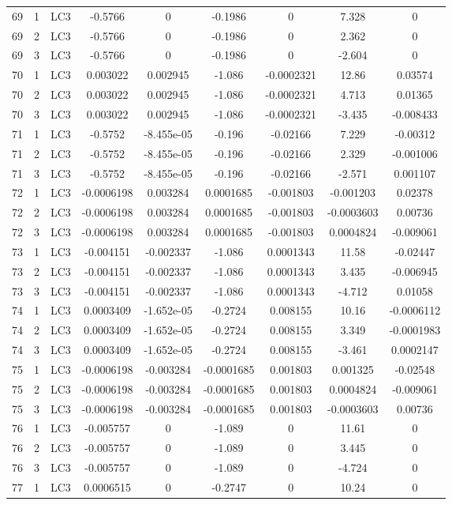 \documentclass{article}%
\begin{document}
\begin{longtable}{| c c c | c c c c c c |}
69&1&LC3&{-}0.5766&0&{-}0.1986&0&7.328&0\\%
69&2&LC3&{-}0.5766&0&{-}0.1986&0&2.362&0\\%
69&3&LC3&{-}0.5766&0&{-}0.1986&0&{-}2.604&0\\%
70&1&LC3&0.003022&0.002945&{-}1.086&{-}0.0002321&12.86&0.03574\\%
70&2&LC3&0.003022&0.002945&{-}1.086&{-}0.0002321&4.713&0.01365\\%
70&3&LC3&0.003022&0.002945&{-}1.086&{-}0.0002321&{-}3.435&{-}0.008433\\%
71&1&LC3&{-}0.5752&{-}8.455e{-}05&{-}0.196&{-}0.02166&7.229&{-}0.00312\\%
71&2&LC3&{-}0.5752&{-}8.455e{-}05&{-}0.196&{-}0.02166&2.329&{-}0.001006\\%
71&3&LC3&{-}0.5752&{-}8.455e{-}05&{-}0.196&{-}0.02166&{-}2.571&0.001107\\%
72&1&LC3&{-}0.0006198&0.003284&0.0001685&{-}0.001803&{-}0.001203&0.02378\\%
72&2&LC3&{-}0.0006198&0.003284&0.0001685&{-}0.001803&{-}0.0003603&0.00736\\%
72&3&LC3&{-}0.0006198&0.003284&0.0001685&{-}0.001803&0.0004824&{-}0.009061\\%
73&1&LC3&{-}0.004151&{-}0.002337&{-}1.086&0.0001343&11.58&{-}0.02447\\%
73&2&LC3&{-}0.004151&{-}0.002337&{-}1.086&0.0001343&3.435&{-}0.006945\\%
73&3&LC3&{-}0.004151&{-}0.002337&{-}1.086&0.0001343&{-}4.712&0.01058\\%
74&1&LC3&0.0003409&{-}1.652e{-}05&{-}0.2724&0.008155&10.16&{-}0.0006112\\%
74&2&LC3&0.0003409&{-}1.652e{-}05&{-}0.2724&0.008155&3.349&{-}0.0001983\\%
74&3&LC3&0.0003409&{-}1.652e{-}05&{-}0.2724&0.008155&{-}3.461&0.0002147\\%
75&1&LC3&{-}0.0006198&{-}0.003284&{-}0.0001685&0.001803&0.001325&{-}0.02548\\%
75&2&LC3&{-}0.0006198&{-}0.003284&{-}0.0001685&0.001803&0.0004824&{-}0.009061\\%
75&3&LC3&{-}0.0006198&{-}0.003284&{-}0.0001685&0.001803&{-}0.0003603&0.00736\\%
76&1&LC3&{-}0.005757&0&{-}1.089&0&11.61&0\\%
76&2&LC3&{-}0.005757&0&{-}1.089&0&3.445&0\\%
76&3&LC3&{-}0.005757&0&{-}1.089&0&{-}4.724&0\\%
77&1&LC3&0.0006515&0&{-}0.2747&0&10.24&0\\%

\end{longtable}
\end{document}
